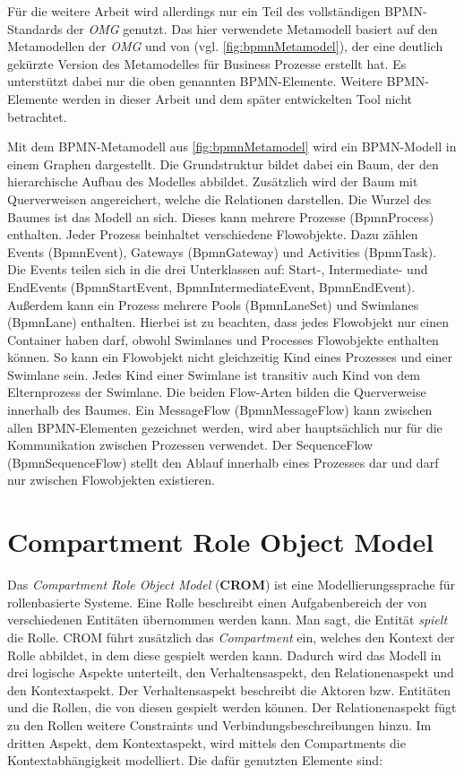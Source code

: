 Für die weitere Arbeit wird allerdings nur ein Teil des vollständigen BPMN-Standards der \emph{OMG} genutzt.
Das hier verwendete Metamodell basiert auf den Metamodellen der \emph{OMG} und von \cite{Loja2010} (vgl. \cref{fig:bpmnMetamodel}), der eine deutlich gekürzte Version des Metamodelles für Business Prozesse erstellt hat.
Es unterstützt dabei nur die oben genannten BPMN-Elemente.
Weitere BPMN-Elemente werden in dieser Arbeit und dem später entwickelten Tool nicht betrachtet.

Mit dem BPMN-Metamodell aus \cref{fig:bpmnMetamodel} wird ein BPMN-Modell in einem Graphen dargestellt.
Die Grundstruktur bildet dabei ein Baum, der den hierarchische Aufbau des Modelles abbildet.
Zusätzlich wird der Baum mit Querverweisen angereichert, welche die Relationen darstellen.
Die Wurzel des Baumes ist das Modell an sich.
Dieses kann mehrere Prozesse (BpmnProcess) enthalten.
Jeder Prozess beinhaltet verschiedene Flowobjekte. 
Dazu zählen Events (BpmnEvent), Gateways (BpmnGateway) und Activities (BpmnTask).
Die Events teilen sich in die drei Unterklassen auf: Start-, Intermediate- und EndEvents (BpmnStartEvent, BpmnIntermediateEvent, BpmnEndEvent).
Außerdem kann ein Prozess mehrere Pools (BpmnLaneSet) und Swimlanes (BpmnLane) enthalten.
Hierbei ist zu beachten, dass jedes Flowobjekt nur einen Container haben darf, obwohl Swimlanes und Processes Flowobjekte enthalten können.
So kann ein Flowobjekt nicht gleichzeitig Kind eines Prozesses und einer Swimlane sein.
Jedes Kind einer Swimlane ist transitiv auch Kind von dem Elternprozess der Swimlane.
Die beiden Flow-Arten bilden die Querverweise innerhalb des Baumes.
Ein MessageFlow (BpmnMessageFlow) kann zwischen allen BPMN-Elementen gezeichnet werden, wird aber hauptsächlich nur für die Kommunikation zwischen Prozessen verwendet.
Der SequenceFlow (BpmnSequenceFlow) stellt den Ablauf innerhalb eines Prozesses dar und darf nur zwischen Flowobjekten existieren.

\section{Compartment Role Object Model}

Das \emph{Compartment Role Object Model} (\textbf{CROM}) ist eine Modellierungssprache für rollenbasierte Systeme.
Eine Rolle beschreibt einen Aufgabenbereich der von verschiedenen Entitäten übernommen werden kann.
Man sagt, die Entität \emph{spielt} die Rolle.
CROM führt zusätzlich das \emph{Compartment} ein, welches den Kontext der Rolle abbildet, in dem diese gespielt werden kann.
Dadurch wird das Modell in drei logische Aspekte unterteilt, den Verhaltensaspekt, den Relationenaspekt und den Kontextaspekt.
Der Verhaltensaspekt beschreibt die Aktoren bzw. Entitäten und die Rollen, die von diesen gespielt werden können.
Der Relationenaspekt fügt zu den Rollen weitere Constraints und Verbindungsbeschreibungen hinzu.
Im dritten Aspekt, dem Kontextaspekt, wird mittels den Compartments die Kontextabhängigkeit modelliert.
Die dafür genutzten Elemente sind:

